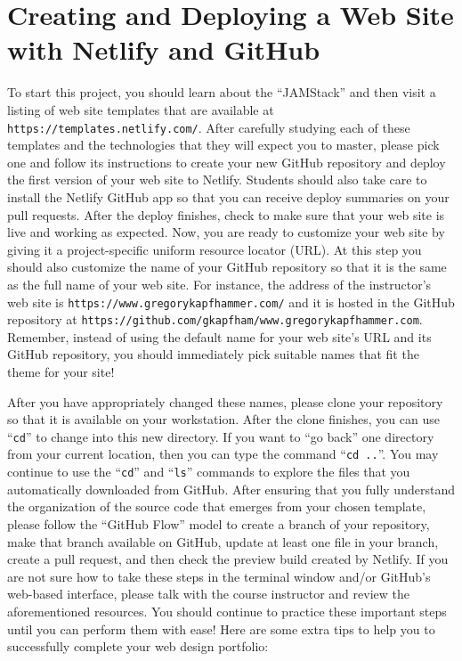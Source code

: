 \documentclass[11pt]{article}
\newcommand{\command}[1]{``\lstinline{#1}''}
\newcommand{\url}[1]{\lstinline{#1}}
\newcommand{\step}[1]{``{#1}''}
\begin{document}
\section*{Creating and Deploying a Web Site with Netlify and GitHub}

To start this project, you should learn about the ``JAMStack'' and then visit a
listing of web site templates that are available at
\url{https://templates.netlify.com/}. After carefully studying each of these
templates and the technologies that they will expect you to master, please pick
one and follow its instructions to create your new GitHub repository and deploy
the first version of your web site to Netlify.
%
Students should also take care to install the Netlify GitHub app so that you can
receive deploy summaries on your pull requests.
%
After the deploy finishes, check to make sure that your web site is live and
working as expected.
%
Now, you are ready to customize your web site by giving it a project-specific
uniform resource locator (URL). At this step you should also customize the name
of your GitHub repository so that it is the same as the full name of your web
site. For instance, the address of the instructor's web site is
\url{https://www.gregorykapfhammer.com/} and it is hosted in the GitHub
repository at \url{https://github.com/gkapfham/www.gregorykapfhammer.com}.
%
Remember, instead of using the default name for your web site's URL and its
GitHub repository, you should immediately pick suitable names that fit the theme
for your site!

After you have appropriately changed these names, please clone your repository
so that it is available on your workstation.
%
After the clone finishes, you can use \command{cd} to change into this new
directory. If you want to \step{go back} one directory from your current
location, then you can type the command \command{cd ..}. You may continue to use
the \command{cd} and \command{ls} commands to explore the files that you
automatically downloaded from GitHub.
%
After ensuring that you fully understand the organization of the source code
that emerges from your chosen template, please follow the ``GitHub Flow'' model
to create a branch of your repository, make that branch available on GitHub,
update at least one file in your branch, create a pull request, and then check
the preview build created by Netlify.
%
If you are not sure how to take these steps in the terminal window and/or
GitHub's web-based interface, please talk with the course instructor and review
the aforementioned resources.
%
You should continue to practice these important steps until you can perform them
with ease!
%
Here are some extra tips to help you to successfully complete your web design
portfolio:
\end{document}
